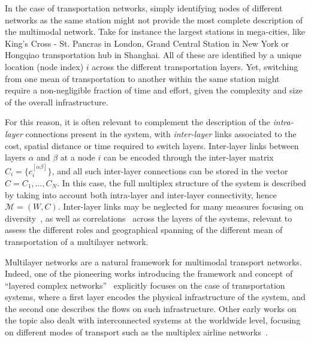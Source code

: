 In the case of transportation networks, simply identifying nodes of different networks as the same station might not provide the most complete description of the multimodal network. Take for instance the largest stations in mega-cities, like King's Cross - St. Pancras in London, Grand Central Station in New York or Hongqiao transportation hub in Shanghai. All of these are identified by a unique location (node index) $i$ across the different transportation layers. Yet, switching from one mean of transportation to another within the same station might require a non-negligible fraction of time and effort, given the complexity and size of the overall infrastructure. 

For this reason, it is often relevant to complement the description of the \textit{intra-layer} connections present in the system, with \textit{inter-layer} links associated to the cost, spatial distance or time required to switch layers. Inter-layer links between layers $\alpha$ and $\beta$ at a node $i$ can be encoded through the inter-layer matrix $C_i=\{c_i^{[\alpha \beta]} \}$, and all such inter-layer connections can be stored in the vector $ C = {C_1, \ldots, C_N}$. In this case, the full multiplex structure of the system is described by taking into account both intra-layer and inter-layer connectivity, hence $\mathcal M = ( W,  C)$. Inter-layer links may be neglected for many measures focusing on diversity~\cite{battiston2014structural}, as well as correlations~\cite{nicosia2015measuring} across the layers of the systems, relevant to assess the different roles and geographical spanning of the different mean of transportation of a multilayer network. 

Multilayer networks are a natural framework for multimodal transport networks. Indeed, one of the pioneering works introducing the framework and concept of ``layered complex networks''~\cite{kurant2006layered} explicitly focuses on the case of transportation systems, where a first layer encodes the physical infrastructure of the system, and the second one describes the flows on such infrastructure. Other early works on the topic also dealt with interconnected systems at the worldwide level, focusing on different modes of transport such as the multiplex airline networks~\cite{cardillo2013emergence}.

